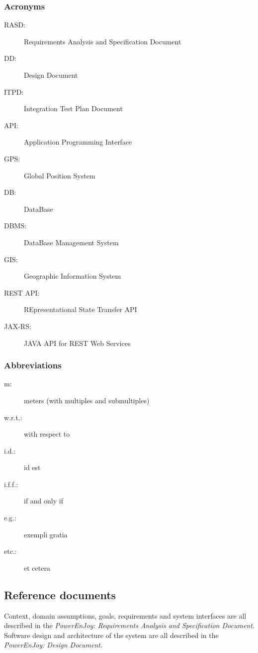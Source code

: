 \subsubsection{Acronyms}
	\begin{description}
		\item [RASD:] Requirements Analysis and Specification Document
		\item [DD:] Design Document
		\item [ITPD:] Integration Test Plan Document
		\item [API:] Application Programming Interface
		\item [GPS:] Global Position System
		\item [DB:] DataBase
		\item [DBMS:] DataBase Management System
		\item [GIS:] Geographic Information System
		\item [REST API:] REpresentational State Transfer API
		\item [JAX-RS:] JAVA API for REST Web Services
	\end{description}
\subsubsection{Abbreviations}
	\begin{description}
		\item [m:] meters (with multiples and submultiples)
		\item [w.r.t.:] with respect to
		\item [i.d.:] id est
		\item [i.f.f.:] if and only if
		\item [e.g.:] exempli gratia
		\item [etc.:] et cetera
	\end{description}

\subsection{Reference documents}
Context, domain assumptions, goals, requirements and system interfaces are all described in the \emph{PowerEnJoy: Requirements Analysis and Specification Document}.\cite{RASD}\\
Software design and architecture of the system are all described in the \emph{PowerEnJoy: Design Document}.\cite{DD}\\

